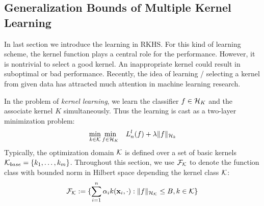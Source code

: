 %
%
\subsection{Generalization Bounds of Multiple Kernel Learning}

In last section we introduce the learning in RKHS. For this kind of learning
scheme, the kernel function plays a central role for the performance.
However, it is nontrivial to select a good kernel. An inappropriate kernel
could result in suboptimal or bad performance. Recently, the idea of
learning / selecting a kernel from given data has attracted much attention
in machine learning research.

In the problem of {\em kernel learning}, we learn the classifier $f \in
{\cal H}_K$ and the associate kernel $K$ simultaneously. Thus the learning is
cast as a two-layer minimization problem:
\begin{eqnarray}
&\min_{k \in \k} \min_{f \in \h_K}& L^{l}_n(f) + \lambda \|f\|_{\h_k} \label{eqn:kl}
\end{eqnarray}
Typically, the optimization domain ${\cal K}$ is defined over a set of basic kernels ${\cal K}_{base} = \{k_1, \ldots, k_m\}$. Throughout this section, we use ${\cal F}_{\cal K}$ to denote the function class with bounded norm in Hilbert space depending the kernel class ${\cal K}$:
\begin{equation}
\f_\k := \{ \sum_{i=1}^n \alpha_ik(\x_i, \cdot): \| f \|_{\h_\k} \leq B, k \in \k \} \label{eqn:linear-f-class}
\end{equation}

